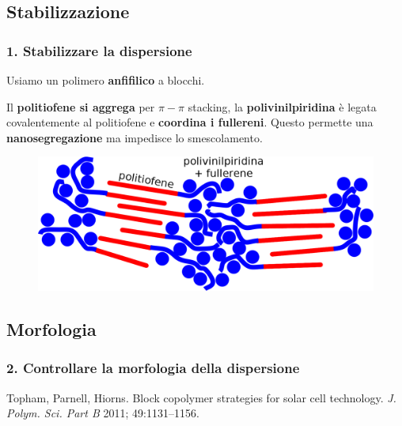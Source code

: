 \documentclass{beamer}
\begin{document}
\subsection{Stabilizzazione}
\begin{frame}%
\frametitle{1. Stabilizzare la dispersione}
Usiamo un polimero \textbf{anfifilico} a blocchi. 
\vfill

Il \textbf{politiofene si aggrega} per $\pi-\pi$ stacking, la \textbf{polivinilpiridina} è legata covalentemente al politiofene e \textbf{coordina i fullereni}.
\vfill
Questo permette una \textbf{nanosegregazione} ma impedisce lo smescolamento.
\vfill
\begin{figure}\centering \includegraphics[width=.7\textwidth]{img/blocchi_PCBM-testo.png}\end{figure}
\end{frame}
\subsection{Morfologia}
\begin{frame}%
\frametitle{2. Controllare la morfologia della dispersione}
\vfill 
{}
\vfill 
{}
\vfill
{}
\vspace{-20pt}
{\tiny Topham, Parnell, Hiorns. Block copolymer strategies for solar cell technology. \textit{J. Polym. Sci. Part B} 2011; 49:1131–1156.}
\end{frame}
\end{document}
